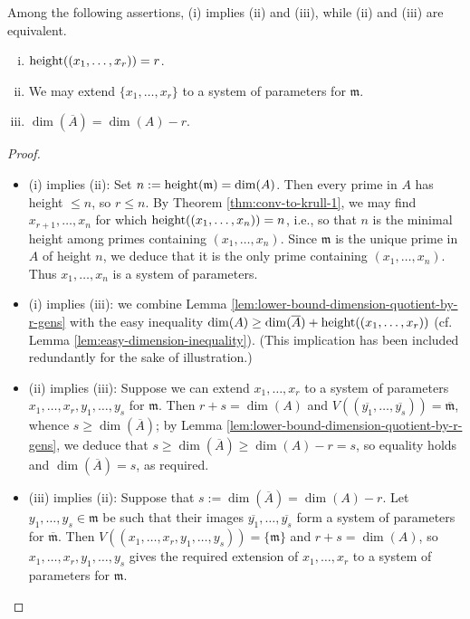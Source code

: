 \documentclass[reqno]{amsart}
\begin{document}
\begin{theorem}\label{thm:extensions-systems-params}
  Among the following assertions,
  (i) implies (ii) and (iii),
  while (ii) and (iii) are equivalent.
  \begin{enumerate}[(i)]
  \item $\operatorname{height}((x_1,\dotsc,x_r)) = r$.
  \item We may extend $\{x_1,\dotsc,x_r\}$ to a system of
    parameters
    for $\mathfrak{m}$.
  \item $\dim(\overline{A}) = \dim(A) - r$.
  \end{enumerate}
\end{theorem}
\begin{proof}~
  \begin{itemize}
  \item (i) implies (ii): Set
    $n := \operatorname{height}(\mathfrak{m}) = \dim(A)$.  Then every prime in
    $A$ has height $\leq n$, so $r \leq n$.  By Theorem \ref{thm:conv-to-krull-1},
     we may find
    $x_{r+1},\dotsc,x_n$ for which
    $\operatorname{height}((x_1,\dotsc,x_n)) = n$, i.e., so that $n$ is the
    minimal height among primes containing $(x_1,\dotsc,x_n)$.
    Since $\mathfrak{m}$ is the unique prime in $A$ of height
    $n$, we deduce that it is the only prime containing
    $(x_1,\dotsc,x_n)$.
    Thus $x_1,\dotsc,x_n$ is a system of parameters.
  \item
    (i) implies (iii):
    we combine Lemma
    \ref{lem:lower-bound-dimension-quotient-by-r-gens}
    with the easy inequality
    $\dim(A) \geq \dim(\overline{A}) +
    \operatorname{height}((x_1,\dotsc,x_r))$ (cf. Lemma \ref{lem:easy-dimension-inequality}).
    (This implication has been included redundantly for the sake of illustration.)
  \item (ii) implies (iii):
    Suppose we can extend $x_1,\dotsc,x_r$
    to a system of parameters $x_1,\dotsc,x_r,y_1,\dotsc,y_s$
    for $\mathfrak{m}$.
    Then $r + s = \dim(A)$
    and $V((\overline{y_1},\dotsc,\overline{y_s})) =
    \overline{\mathfrak{m}}$,
    whence $s \geq \dim(\overline{A})$;
    by Lemma \ref{lem:lower-bound-dimension-quotient-by-r-gens},
    we deduce that
    $s \geq \dim(\overline{A}) \geq \dim(A) - r = s$,
    so equality holds and $\dim(\overline{A}) = s$, as required.
  \item (iii) implies (ii): Suppose that
    $s := \dim(\overline{A}) = \dim(A) - r$.  Let
    $y_1,\dotsc,y_s \in \mathfrak{m}$ be such that their images
    $\overline{y_1},\dotsc,\overline{y_s}$ form a system of
    parameters for $\overline{\mathfrak{m}}$.  Then
    $V((x_1,\dotsc,x_r,y_1,\dotsc,y_s)) = \{\mathfrak{m}\}$ and
    $r + s = \dim(A)$, so $x_1,\dotsc,x_r,y_1,\dotsc,y_s$ gives
    the required extension of $x_1,\dotsc,x_r$ to a system of
    parameters for $\mathfrak{m}$.
\end{itemize}
\end{proof}
\end{document}
